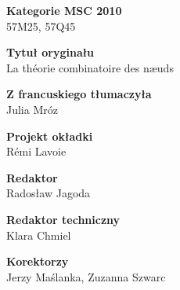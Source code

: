 {\noindent \textbf{Kategorie MSC 2010}\\57M25, 57Q45}
\vspace{5mm}

{\noindent \textbf{Tytuł oryginału}\\La théorie combinatoire des næuds}
\vspace{5mm}

{\noindent \textbf{Z francuskiego tłumaczyła}\\Julia Mróz}
\vspace{5mm}

{\noindent \textbf{Projekt okładki}\\Rémi Lavoie}
\vspace{5mm}

{\noindent \textbf{Redaktor}\\Radosław Jagoda}
\vspace{5mm}

{\noindent \textbf{Redaktor techniczny}\\Klara Chmiel}
\vspace{5mm}

{\noindent \textbf{Korektorzy}\\Jerzy Maślanka, Zuzanna Szwarc}



\tableofcontents
